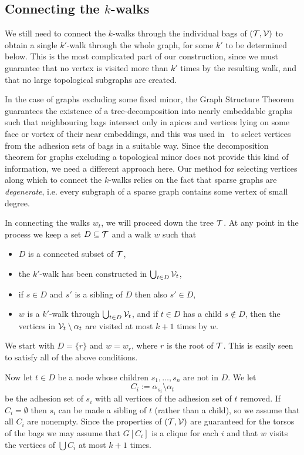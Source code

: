 \documentclass[12pt]{amsart}
\begin{document}
\subsection{Connecting the $k$-walks}

We still need to connect the $k$-walks through the individual bags of
$(\mathcal{T},\mathcal{V})$ to obtain a single $k'$-walk through the whole graph,
for some $k'$ to be determined below. This is the most complicated
part of our construction, since we must guarantee that no vertex is
visited more than $k'$ times by the resulting walk, and that no large
topological subgraphs are created.

In the case of graphs excluding some fixed minor, the Graph Structure
Theorem guarantees the existence of a tree-decomposition into nearly
embeddable graphs such that neighbouring bags intersect only in apices
and vertices lying on some face or vortex of their near embeddings,
and this was used in~\cite{ekk13} to select vertices from the adhesion
sets of bags in a suitable way. Since the decomposition theorem for
graphs excluding a topological minor does not provide this kind of
information, we need a different approach here. Our method for
selecting vertices along which to connect the $k$-walks relies on the
fact that sparse graphs are \emph{degenerate}, i.e. every subgraph of
a sparse graph contains some vertex of small degree.

In connecting the walks $w_t$, we will proceed down the tree
$\mathcal{T}$. At any point in the process we keep a set $D \subseteq \mathcal{T}$
and a walk $w$ such that
\begin{itemize}
\item $D$ is a connected subset of $\mathcal{T}$,
\item the $k'$-walk has been constructed in $\bigcup_{t \in D} \mathcal{V}_t$,
\item if $s \in D$ and $s'$ is a sibling of $D$ then also $s' \in D$,
\item $w$ is a $k'$-walk through $\bigcup_{t \in D} \mathcal{V}_t$, and if
  $t \in D$ has a child $s \not\in D$, then the vertices in $\mathcal{V}_t
  \setminus \alpha_t$ are visited at most $k+1$ times by $w$.
\end{itemize}
We start with $D = \{r\}$ and $w = w_r$, where $r$ is the root of
$\mathcal{T}$. This is easily seen to satisfy all of the above conditions.

Now let $t \in D$ be a node whose children $s_1,\ldots,s_{n}$ are not
in $D$. We let
\[
C_i := \alpha_{s_i} \setminus \alpha_t
\]
be the adhesion set of $s_i$ with all vertices of the adhesion set of
$t$ removed. If $C_i = \emptyset$ then $s_i$ can be made a sibling of
$t$ (rather than a child), so we assume that all $C_i$ are
nonempty. Since the properties of $(\mathcal{T},\mathcal{V})$ are guaranteed for
the torsos of the bags we may assume that $G[C_i]$ is a clique for
each $i$ and that $w$ visits the vertices of $\bigcup C_i$ at most $k+1$
times.
\end{document}
